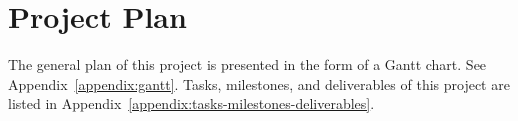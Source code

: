 \section{Project Plan}

The general plan of this project is presented in the form of a Gantt chart. See Appendix~\ref{appendix:gantt}. Tasks, milestones, and deliverables of this project are listed in Appendix~\ref{appendix:tasks-milestones-deliverables}.

